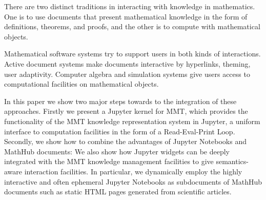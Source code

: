 There are two distinct traditions in interacting with knowledge in mathematics.
One is to use documents that present mathematical knowledge in the form of definitions, theorems, and proofs, and the other is to compute with mathematical objects.

Mathematical software systems try to support users in both kinds of interactions. Active document systems make documents interactive by hyperlinks, theming, user adaptivity. 
Computer algebra and simulation systems give users access to computational facilities on mathematical objects.

In this paper we show two major steps towards to the integration of these approaches.  
Firstly we present a Jupyter kernel for MMT, which provides the functionality of the MMT knowledge representation system in Jupyter, a uniform interface to computation facilities in the form of a Read-Eval-Print Loop.
Secondly, we show how to combine the advantages of Jupyter Notebooks and MathHub documents:
We also show how Jupyter widgets can be deeply integrated with the MMT knowledge management facilities to give semantics-aware interaction facilities.
In particular, we dynamically employ the highly interactive and often ephemeral Jupyter Notebooks as subdocuments of MathHub documents such as static HTML pages generated from scientific articles.


